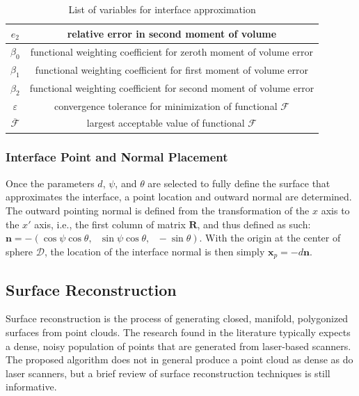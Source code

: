 \begin{table}[htbp!]
\begin{tabular}{|c||c|}
   $e_2$ & relative error in second moment of volume \\ \hline   
   $\beta_0$ & functional weighting coefficient for zeroth moment of volume error \\ \hline
   $\beta_1$ & functional weighting coefficient for first moment of volume error \\ \hline
   $\beta_2$ & functional weighting coefficient for second moment of volume error \\ \hline 
   $\varepsilon$ & convergence tolerance for minimization of functional $\mathcal{F}$ \\ \hline
   $\overline{\mathcal{F}}$ \rule{0mm}{4mm} & largest acceptable value of functional $\mathcal{F}$ \\ \hline        
\end{tabular}
\caption{List of variables for interface approximation}
\label{tab:surface}
\end{table}

\subsubsection{Interface Point and Normal Placement}

Once the parameters $d$, $\psi$, and $\theta$ are selected to fully define the surface that approximates the interface, a point location and outward normal are determined. The outward pointing normal is defined from the transformation of the $x$ axis to the $x'$ axis, i.e., the first column of matrix $\bm{R}$, and thus defined as such: $\bm{n} = -(\cos\psi\cos\theta,\text{\ }\sin\psi\cos\theta,\text{\ }-\sin\theta)$. With the origin at the center of sphere $\mathcal{D}$, the location of the interface normal is then simply $\mathbf{x}_p = -d\bm{n}$.

\subsection{Surface Reconstruction}
\label{Surface Reconstruction}

Surface reconstruction is the process of generating closed, manifold, polygonized surfaces from point clouds. The research found in the literature typically expects a dense, noisy population of points that are generated from laser-based scanners. The proposed algorithm does not in general produce a point cloud as dense as do laser scanners, but a brief review of surface reconstruction techniques is still informative.

